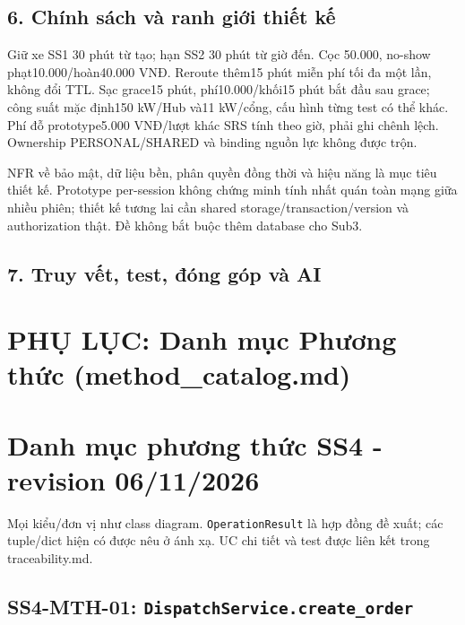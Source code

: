 \documentclass[11pt,a4paper]{article}
\begin{document}
\hypertarget{chuxednh-suxe1ch-vuxe0-ranh-giux1edbi-thiux1ebft-kux1ebf}{%
\subsection{6. Chính sách và ranh giới thiết
kế}\label{chuxednh-suxe1ch-vuxe0-ranh-giux1edbi-thiux1ebft-kux1ebf}}

Giữ xe SS1 30 phút từ tạo; hạn SS2 30 phút từ giờ đến. Cọc 50.000,
no-show phạt10.000/hoàn40.000 VNĐ. Reroute thêm15 phút miễn phí tối đa
một lần, không đổi TTL. Sạc grace15 phút, phí10.000/khối15 phút bắt đầu
sau grace; công suất mặc định150 kW/Hub và11 kW/cổng, cấu hình từng test
có thể khác. Phí đỗ prototype5.000 VNĐ/lượt khác SRS tính theo giờ, phải
ghi chênh lệch. Ownership PERSONAL/SHARED và binding nguồn lực không
được trộn.

NFR về bảo mật, dữ liệu bền, phân quyền đồng thời và hiệu năng là mục
tiêu thiết kế. Prototype per-session không chứng minh tính nhất quán
toàn mạng giữa nhiều phiên; thiết kế tương lai cần shared
storage/transaction/version và authorization thật. Đề không bắt buộc
thêm database cho Sub3.

\hypertarget{truy-vux1ebft-test-ux111uxf3ng-guxf3p-vuxe0-ai}{%
\subsection{7. Truy vết, test, đóng góp và
AI}\label{truy-vux1ebft-test-ux111uxf3ng-guxf3p-vuxe0-ai}}

\newpage
\section*{PHỤ LỤC: Danh mục Phương thức (method\_catalog.md)}
\hypertarget{danh-mux1ee5c-phux1b0ux1a1ng-thux1ee9c-ss4---revision-06112026}{%
\section{Danh mục phương thức SS4 - revision
06/11/2026}\label{danh-mux1ee5c-phux1b0ux1a1ng-thux1ee9c-ss4---revision-06112026}}

Mọi kiểu/đơn vị như class diagram. \texttt{OperationResult} là hợp đồng
đề xuất; các tuple/dict hiện có được nêu ở ánh xạ. UC chi tiết và test
được liên kết trong traceability.md.

\hypertarget{ss4-mth-01-dispatchservice.create_order}{%
\subsection{\texorpdfstring{SS4-MTH-01:
\texttt{DispatchService.create\_order}}{SS4-MTH-01: DispatchService.create\_order}}\label{ss4-mth-01-dispatchservice.create_order}}
\end{document}

